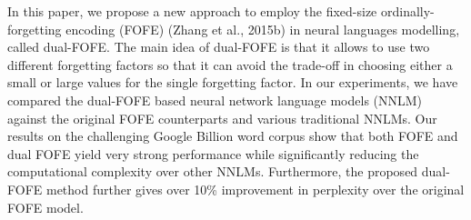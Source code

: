 In this paper, we propose a new approach to employ the fixed-size ordinally-forgetting encoding (FOFE) (Zhang et al., 2015b) in neural languages modelling, called dual-FOFE. The main idea of dual-FOFE is that it allows to use two different forgetting factors so that it can avoid the trade-off in choosing either a small or large values for the single forgetting factor. In our experiments, we have compared the dual-FOFE based neural network language models (NNLM) against the original FOFE counterparts and various traditional NNLMs. Our results on the challenging Google Billion word corpus show that both FOFE and dual FOFE yield very strong performance while significantly reducing the computational complexity over other NNLMs. Furthermore, the proposed dual-FOFE method further gives over 10\% improvement in perplexity over the original FOFE model.
